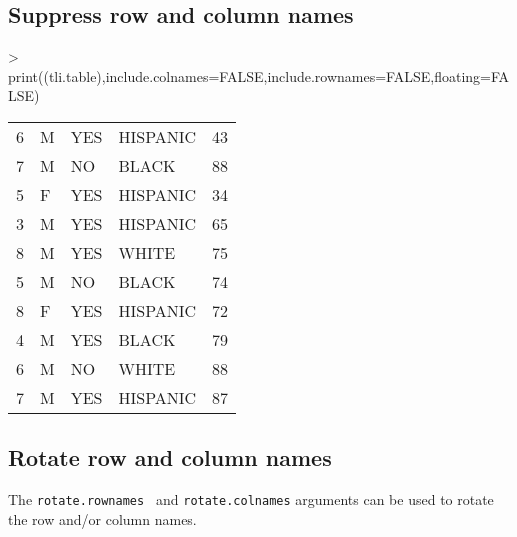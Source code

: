 \documentclass[letterpaper]{article}
\begin{document}
\subsection{Suppress row and column names}
\begin{Schunk}
\begin{Sinput}
> print((tli.table),include.colnames=FALSE,include.rownames=FALSE,floating=FALSE)
\end{Sinput}
% latex table generated in R 3.1.1 by xtable 1.7-3 package
% 
\begin{tabular}{r|lp{3cm}l|r|}
  \hline
  \hline
6 & M & YES & HISPANIC & 43 \\ 
   7 & M & NO & BLACK & 88 \\ 
    5 & F & YES & HISPANIC &  34 \\ 
     3 & M & YES & HISPANIC &   65 \\ 
      8 & M & YES & WHITE &    75 \\ 
  5 & M & NO & BLACK & 74 \\ 
   8 & F & YES & HISPANIC & 72 \\ 
    4 & M & YES & BLACK &  79 \\ 
     6 & M & NO & WHITE &   88 \\ 
      7 & M & YES & HISPANIC &    87 \\ 
   \hline
\end{tabular}\end{Schunk}

\subsection{Rotate row and column names}
The {\tt rotate.rownames } and {\tt rotate.colnames} arguments can be
used to rotate the row and/or column names.
\end{document}
